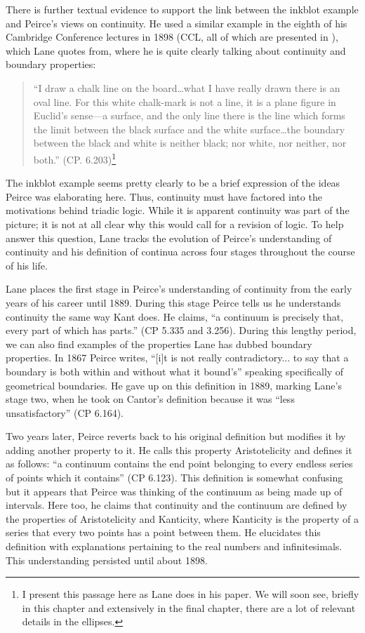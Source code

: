 There is further textual evidence to support the link between the inkblot example and Peirce's views on continuity. He used a similar example in the eighth of his Cambridge Conference lectures in 1898 (CCL, all of which are presented in \cite{peirce_reasoning_1992}), which Lane quotes from, where he is quite clearly talking about continuity and boundary properties:
\begin{quotation}
\noindent``I draw a chalk line on the board\dots what I have really drawn there is an oval line. For this white chalk-mark is not a line, it is a plane figure in Euclid’s sense---a surface, and the only line there is the line which forms the limit between the black surface and the white surface\dots the boundary between the black and white is neither black; nor white, nor neither, nor both.'' (CP. 6.203)\label{laneq}\footnote{I present this passage here as Lane does in his paper. We will soon see, briefly in this chapter and extensively in the final chapter, there are a lot of relevant details in the ellipses.}
\end{quotation}
\noindent The inkblot example seems pretty clearly to be a brief expression of the ideas Peirce was elaborating here. Thus, continuity must have factored into the motivations behind triadic logic. While it is apparent continuity was part of the picture; it is not at all clear why this would call for a revision of logic. To help answer this question, Lane tracks the evolution of Peirce’s understanding of continuity and his definition of continua across four stages throughout the course of his life.

Lane places the first stage in Peirce's understanding of continuity from the early years of his career until 1889. During this stage Peirce tells us he understands continuity the same way Kant does. He claims, ``a continuum is precisely that, every part of which has parts.'' (CP 5.335 and 3.256). During this lengthy period, we can also find examples of the properties Lane has dubbed boundary properties. In 1867 Peirce  writes, ``[i]t is not really contradictory... to say that a boundary is both within and without what it bound's” speaking specifically of geometrical boundaries. He gave up on this definition in 1889, marking Lane's stage two, when he took on Cantor's definition because it was ``less unsatisfactory'' (CP 6.164).

Two years later, Peirce reverts back to his original definition but modifies it by adding another property to it. He calls this property Aristotelicity and defines it as follows: ``a continuum contains the end point belonging to every endless series of points which it contains'' (CP 6.123). This definition is somewhat confusing but it appears that Peirce was thinking of the continuum as being made up of intervals. Here too, he claims that continuity and the continuum are defined by the properties of Aristotelicity and Kanticity, where Kanticity is the property of a series that every two points has a point between them. He elucidates this definition with explanations pertaining to the real numbers and infinitesimals. This understanding persisted until about 1898.

